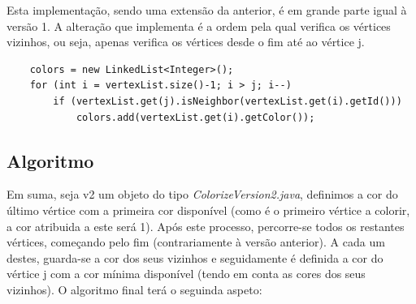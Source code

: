 \documentclass[a4paper,10pt]{report}
\begin{document}
Esta implementação, sendo uma extensão da anterior, é em grande parte igual à versão 1. A alteração que implementa é a ordem pela qual verifica os vértices vizinhos, ou seja, apenas verifica os vértices desde o fim até ao vértice j.

\begin{lstlisting}
    colors = new LinkedList<Integer>();
    for (int i = vertexList.size()-1; i > j; i--)
        if (vertexList.get(j).isNeighbor(vertexList.get(i).getId()))
            colors.add(vertexList.get(i).getColor());
\end{lstlisting}

\subsection{Algoritmo}

Em suma, seja v2 um objeto do tipo \textit{ColorizeVersion2.java}, definimos a cor do último vértice com a primeira cor disponível (como é o primeiro vértice a colorir, a cor atribuida a este será 1).
Após este processo, percorre-se todos os restantes vértices, começando pelo fim (contrariamente à versão anterior). A cada um destes, guarda-se a cor dos seus vizinhos e seguidamente é definida a cor do vértice j com a cor mínima disponível (tendo em conta as cores dos seus vizinhos).
O algoritmo final terá o seguinda aspeto:
\end{document}
